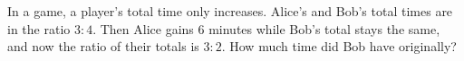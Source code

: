 In a game, a player's total time only increases. Alice's and Bob's total times are in the ratio $3:4$. Then Alice gains $6$ minutes while Bob's total stays the same, and now the ratio of their totals is $3:2$. How much time did Bob have originally?
